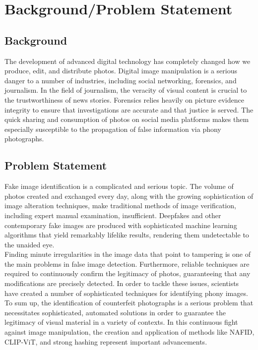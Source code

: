 \documentclass[a4paper,14pt]{report}
\begin{document}
\chapter{Background/Problem Statement}
\section{Background}
The development of advanced digital technology has completely changed how we produce, edit, and distribute photos. Digital image manipulation is a serious danger to a number of industries, including social networking, forensics, and journalism. In the field of journalism, the veracity of visual content is crucial to the trustworthiness of news stories. Forensics relies heavily on picture evidence integrity to ensure that investigations are accurate and that justice is served. The quick sharing and consumption of photos on social media platforms makes them especially susceptible to the propagation of false information via phony photographs.
\section{Problem Statement}
Fake image identification is a complicated and serious topic. The volume of photos created and exchanged every day, along with the growing sophistication of image alteration techniques, make traditional methods of image verification, including expert manual examination, insufficient. Deepfakes and other contemporary fake images are produced with sophisticated machine learning algorithms that yield remarkably lifelike results, rendering them undetectable to the unaided eye.\\
Finding minute irregularities in the image data that point to tampering is one of the main problems in false image detection. Furthermore, reliable techniques are required to continuously confirm the legitimacy of photos, guaranteeing that any modifications are precisely detected. In order to tackle these issues, scientists have created a number of sophisticated techniques for identifying phony images. To sum up, the identification of counterfeit photographs is a serious problem that necessitates sophisticated, automated solutions in order to guarantee the legitimacy of visual material in a variety of contexts. In this continuous fight against image manipulation, the creation and application of methods like NAFID, CLIP-ViT, and strong hashing represent important advancements.
\end{document}
